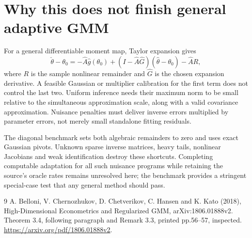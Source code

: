 \documentclass[11pt]{article}
\begin{document}
\section*{Why this does not finish general adaptive GMM}
For a general differentiable moment map, Taylor expansion gives
\[
 \check\theta-\theta_0=-\widehat A\widehat g(\theta_0)
 +(I-\widehat A\widehat G)(\widehat\theta-\theta_0)
 -\widehat A R,
\]
where $R$ is the sample nonlinear remainder and $\widehat G$ is the chosen expansion derivative. A feasible Gaussian or multiplier calibration for the first term does not control the last two. Uniform inference needs their maximum norm to be small relative to the simultaneous approximation scale, along with a valid covariance approximation. Nuisance penalties must deliver inverse errors multiplied by parameter errors, not merely small standalone fitting residuals.

The diagonal benchmark sets both algebraic remainders to zero and uses exact Gaussian pivots. Unknown sparse inverse matrices, heavy tails, nonlinear Jacobians and weak identification destroy these shortcuts. Completing computable adaptation for all such nuisance programs while retaining the source's oracle rates remains unresolved here; the benchmark provides a stringent special-case test that any general method should pass.
\begin{thebibliography}{9}
 A. Belloni, V. Chernozhukov, D. Chetverikov, C. Hansen and K. Kato (2018), High-Dimensional Econometrics and Regularized GMM, arXiv:1806.01888v2. Theorem 3.4, following paragraph and Remark 3.3, printed pp.56--57, inspected. \url{https://arxiv.org/pdf/1806.01888v2}.
\end{thebibliography}
\end{document}
